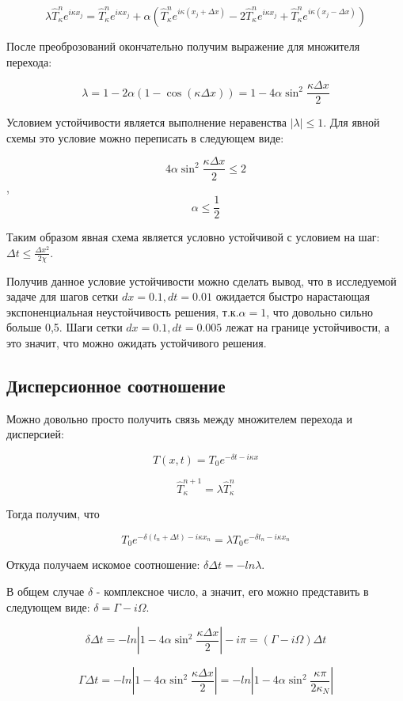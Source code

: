 \documentclass[diploma]{nanolab2015}
\begin{document}
$$\lambda \hat{T}^n_\kappa e^{i \kappa x_j} = \hat{T}^n_\kappa e^{i \kappa x_j} + \alpha(\hat{T}^n_\kappa e^{i \kappa (x_j+\Delta x)} -2\hat{T}^n_\kappa e^{i \kappa x_j}+\hat{T}^n_\kappa e^{i \kappa (x_j-\Delta x)})$$

После преоброзований окончательно получим выражение для множителя перехода:

$$\lambda = 1 - 2\alpha(1-\cos(\kappa \Delta x))=1-4\alpha \sin^2\frac{\kappa \Delta x}{2}$$

Условием устойчивости является выполнение неравенства $|\lambda| \leq 1$. Для явной схемы это условие можно переписать в следующем виде:

$$4\alpha \sin^2\frac{\kappa \Delta x}{2} \leq 2$$, $$\alpha \leq \frac{1}{2}$$

Таким образом явная схема является условно устойчивой с условием на шаг: $\Delta t \leq \frac{\Delta x^2}{2 \chi}$.

Получив данное условие устойчивости можно сделать вывод, что в исследуемой задаче для шагов сетки  $dx = 0.1, dt = 0.01$ ожидается быстро нарастающая экспоненциальная неустойчивость решения, т.к.$\alpha = 1$, что довольно сильно больше 0,5. Шаги сетки $dx = 0.1, dt = 0.005$ лежат на границе устойчивости, а это значит, что можно ожидать устойчивого решения.

\subsection{Дисперсионное соотношение}
Можно довольно просто получить связь между множителем перехода и дисперсией:

$$T(x,t)=T_0 e^{-\delta t - i \kappa x}$$

$$\hat{T}^{n+1}_\kappa = \lambda \hat{T}^{n}_\kappa$$ 

Тогда получим, что

$$T_0 e^{-\delta (t_n+\Delta t) - i \kappa x_n}= \lambda T_0 e^{-\delta t_n - i \kappa x_n}$$

Откуда получаем искомое соотношение: $\delta \Delta t = - ln \lambda$. 

В общем случае $\delta$ - комплексное число, а значит, его можно представить в следующем виде: $\delta = \Gamma - i \Omega$.

$$\delta \Delta t = -ln|1-4\alpha \sin^2\frac{\kappa \Delta x}{2}|-i \pi=(\Gamma - i \Omega)\Delta t$$

$$\Gamma \Delta t = - ln|1-4\alpha \sin^2\frac{\kappa \Delta x}{2}|=- ln|1-4\alpha \sin^2\frac{\kappa \pi}{2 \kappa_N}|$$
\end{document}
